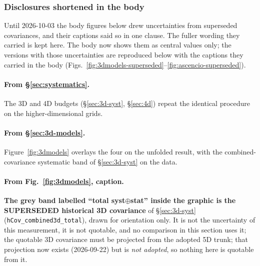 \subsubsection{Disclosures shortened in the body}
Until 2026-10-03 the body figures below drew uncertainties from superseded covariances, and their captions said so in one clause. The fuller wording they carried is kept here. The body now shows them as central values only; the versions with those uncertainties are reproduced below with the captions they carried in the body (Figs.~\ref{fig:3dmodels-superseded}--\ref{fig:ascencio-superseded}).

\paragraph{From \S\ref{sec:systematics}.} The 3D and 4D budgets (\S\ref{sec:3d-syst}, \S\ref{sec:4d}) repeat the identical procedure on the higher-dimensional grids.

\paragraph{From \S\ref{sec:3d-models}.} Figure~\ref{fig:3dmodels} overlays the four on the unfolded result, with the combined-covariance systematic band of \S\ref{sec:3d-syst} on the data.

\paragraph{From Fig.~\ref{fig:3dmodels}, caption.} \textbf{The grey band labelled ``total syst$\oplus$stat'' inside the graphic is the SUPERSEDED historical 3D covariance} of \S\ref{sec:3d-syst} (\texttt{hCov\_combined3d\_total}), drawn for orientation only. It is not the uncertainty of this measurement, it is not quotable, and no comparison in this section uses it; the quotable 3D covariance must be projected from the adopted 5D trunk; that projection now exists (2026-09-22) but is \emph{not adopted}, so nothing here is quotable from it.

